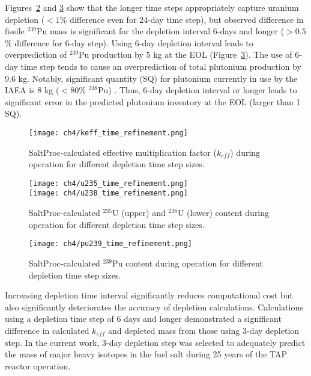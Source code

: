 Figures~\ref{fig:timeref-u} and \ref{fig:timeref-pu239} show that the longer 
time steps appropriately capture uranium depletion ($<1$\% difference even for 
24-day time step), but observed difference in fissile $^{239}$Pu mass is 
significant for the depletion interval 6-days and longer ($>0.5$\% 
difference for 6-day step). Using 6-day depletion interval leads to 
overprediction of $^{239}$Pu production by 5 kg at the \gls{EOL} 
(Figure~\ref{fig:timeref-pu239}). The use of 6-day time step tends to cause an 
overprediction of total plutonium production by 9.6 kg. Notably, significant 
quantity (SQ) for plutonium currently in use by the IAEA is 8 kg ($<80$\% 
$^{238}$Pu) \cite{close_iaea_1995}. Thus, 6-day depletion interval or longer 
leads to significant error in the predicted plutonium inventory at the 
\gls{EOL} (larger than 1 SQ). 
\begin{figure}[hbp!] %
	\centering
	\texttt{[image: ch4/keff\_time\_refinement.png]}
	\caption{SaltProc-calculated effective multiplication factor ($k_{eff}$) 
	during operation for different depletion time step sizes.}
	\label{fig:timeref-keff}
\end{figure}

\begin{figure}[hbp!] %
	\centering
	\texttt{[image: ch4/u235\_time\_refinement.png]}\\
		\vspace{-11mm}
	\hspace{0.5mm}
	\texttt{[image: ch4/u238\_time\_refinement.png]}
		\vspace{-6mm}
	\caption{SaltProc-calculated $^{235}$U (upper) and $^{238}$U (lower) 
	content during operation for different depletion time step sizes.}
	\label{fig:timeref-u}
\end{figure}

\begin{figure}[htp!] %
	\centering
	\texttt{[image: ch4/pu239\_time\_refinement.png]}
	\caption{SaltProc-calculated $^{239}$Pu content during operation for 
		different depletion time step sizes.}
	\label{fig:timeref-pu239}
\end{figure}
Increasing depletion time interval significantly reduces computational cost 
but also significantly deteriorates the accuracy of depletion calculations. 
Calculations using a depletion time step of 6 days and longer demonstrated a 
significant difference in calculated $k_{eff}$ and depleted mass from those 
using 3-day depletion step. In the current work, 3-day depletion step was 
selected to adequately predict the mass of major heavy isotopes in the fuel 
salt during 25 years of the \gls{TAP} reactor operation.


